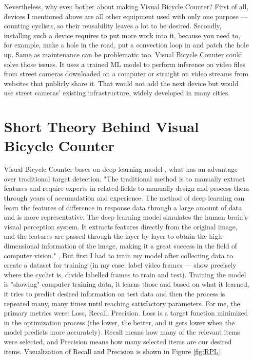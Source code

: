 Nevertheless, why even bother about making Visual Bicycle Counter? First of all, devices I mentioned above are all other equipment used with only one purpose --- counting cyclists, so their reusability leaves a lot to be desired. Secondly, installing such a device requires to put more work into it, because you need to, for example, make a hole in the road, put a convection loop in and patch the hole up. Same as maintenance can be problematic too. Visual Bicycle Counter could solve those issues. It uses a trained ML model to perform inference on video files from street cameras downloaded on a computer or straight on video streams from websites that publicly share it. That would not add the next device but would use street cameras' existing infrastructure, widely developed in many cities.

\section{Short Theory Behind Visual Bicycle Counter}
\label{sec:theory}

Visual Bicycle Counter bases on deep learning model \cite{deepLearning}, what has an advantage over traditional target detection. "The traditional method is to manually extract features and require experts in related fields to manually design and process them through years of accumulation and experience. The method of deep learning can learn the features of difference in response data through a large amount of data and is more representative. The deep learning model simulates the human brain's visual perception system. It extracts features directly from the original image, and the features are passed through the layer by layer to obtain the high-dimensional information of the image, making it a great success in the field of computer vision." \cite{deepLearning}, But first I had to train my model after collecting data to create a dataset for training (in my case: label video frames --- show precisely where the cyclist is, divide labelled frames to train and test). Training the model is "showing" computer training data, it learns those and based on what it learned, it tries to predict desired information on test data and then the process is repeated many, many times until reaching satisfactory parameters. For me, the primary metrics were: Loss, Recall, Precision. Loss is a target function minimized in the optimization process (the lower, the better, and it gets lower when the model predicts more accurately). Recall means how many of the relevant items were selected, and Precision means how many selected items are our desired items. Visualization of Recall and Precision is shown in Figure \ref{fig:RPL}.

